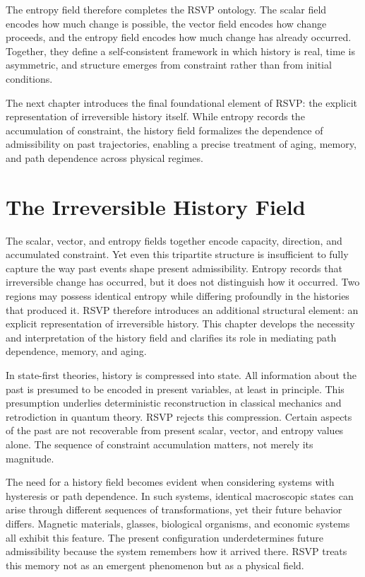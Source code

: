 \documentclass[11pt,oneside]{book}
\begin{document}
The entropy field therefore completes the RSVP ontology. The scalar field encodes how much change is possible, the vector field encodes how change proceeds, and the entropy field encodes how much change has already occurred. Together, they define a self-consistent framework in which history is real, time is asymmetric, and structure emerges from constraint rather than from initial conditions.

The next chapter introduces the final foundational element of RSVP: the explicit representation of irreversible history itself. While entropy records the accumulation of constraint, the history field formalizes the dependence of admissibility on past trajectories, enabling a precise treatment of aging, memory, and path dependence across physical regimes.

\chapter{The Irreversible History Field}

The scalar, vector, and entropy fields together encode capacity, direction, and accumulated constraint. Yet even this tripartite structure is insufficient to fully capture the way past events shape present admissibility. Entropy records that irreversible change has occurred, but it does not distinguish how it occurred. Two regions may possess identical entropy while differing profoundly in the histories that produced it. RSVP therefore introduces an additional structural element: an explicit representation of irreversible history. This chapter develops the necessity and interpretation of the history field and clarifies its role in mediating path dependence, memory, and aging.

In state-first theories, history is compressed into state. All information about the past is presumed to be encoded in present variables, at least in principle. This presumption underlies deterministic reconstruction in classical mechanics and retrodiction in quantum theory. RSVP rejects this compression. Certain aspects of the past are not recoverable from present scalar, vector, and entropy values alone. The sequence of constraint accumulation matters, not merely its magnitude.

The need for a history field becomes evident when considering systems with hysteresis or path dependence. In such systems, identical macroscopic states can arise through different sequences of transformations, yet their future behavior differs. Magnetic materials, glasses, biological organisms, and economic systems all exhibit this feature. The present configuration underdetermines future admissibility because the system remembers how it arrived there. RSVP treats this memory not as an emergent phenomenon but as a physical field.
\end{document}
